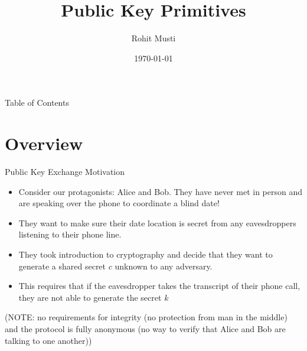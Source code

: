 \documentclass[handout]{beamer}
\title{Public Key Primitives}
\author{Rohit Musti}
\institute{CUNY - Hunter College}
\date{\today}
\begin{document}
 
\frame{\titlepage}

\begin{frame}{Table of Contents}
  \tableofcontents
\end{frame}


\section{Overview}

\begin{frame}{Public Key Exchange Motivation}
    \begin{itemize}
        \item \pause Consider our protagonists: Alice and Bob. They have never met in person and are speaking over the phone to coordinate a blind date!
        \item \pause They want to make sure their date location is secret from any eavesdroppers listening to their phone line.
        \item \pause They took introduction to cryptography and decide that they want to generate a shared secret \(c\) unknown to any adversary.
        \item \pause This requires that if the eavesdropper takes the transcript of their phone call, they are not able to generate the secret \(k\) 
    \end{itemize}
    \pause \text(NOTE: no requirements for integrity (no protection from man in the middle) and the protocol is fully anonymous (no way to verify that Alice and Bob are talking to one another))
\end{frame}
\end{document}

